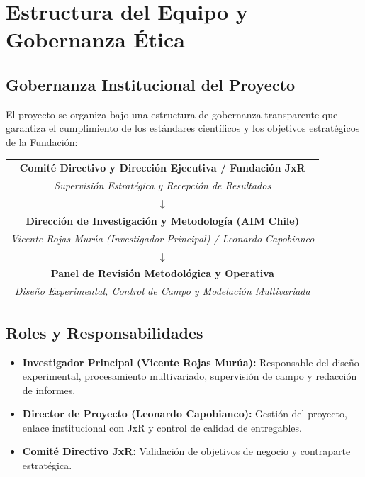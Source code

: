 \section{Estructura del Equipo y Gobernanza Ética}

\subsection{Gobernanza Institucional del Proyecto}

El proyecto se organiza bajo una estructura de gobernanza transparente que garantiza el cumplimiento de los estándares científicos y los objetivos estratégicos de la Fundación:

\begin{center}
\begin{tabular}{|c|}
    \hline
    \textbf{Comité Directivo y Dirección Ejecutiva / Fundación JxR} \\
    \textit{Supervisión Estratégica y Recepción de Resultados} \\
    \hline
    \(\downarrow\) \\
    \hline
    \textbf{Dirección de Investigación y Metodología (AIM Chile)} \\
    \textit{Vicente Rojas Murúa (Investigador Principal) / Leonardo Capobianco} \\
    \hline
    \(\downarrow\) \\
    \hline
    \textbf{Panel de Revisión Metodológica y Operativa} \\
    \textit{Diseño Experimental, Control de Campo y Modelación Multivariada} \\
    \hline
\end{tabular}
\end{center}

\subsection{Roles y Responsabilidades}
\begin{itemize}
    \item \textbf{Investigador Principal (Vicente Rojas Murúa):} Responsable del diseño experimental, procesamiento multivariado, supervisión de campo y redacción de informes.
    \item \textbf{Director de Proyecto (Leonardo Capobianco):} Gestión del proyecto, enlace institucional con JxR y control de calidad de entregables.
    \item \textbf{Comité Directivo JxR:} Validación de objetivos de negocio y contraparte estratégica.
\end{itemize}

